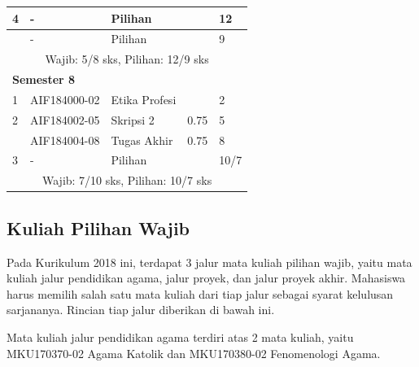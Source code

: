 \begin{table}[H]
\begin{tabular}{|p{0.5cm}|p{2.85cm}|p{4.95cm}|p{2.7cm}|p{2.7cm}|}
			4	& - &	Pilihan	& &	12  \\ \hline
				& - &	Pilihan	& &	9  \\ \hline
			\multicolumn{5}{|c|}{Wajib: 5/8 sks, Pilihan: 12/9 sks} \\ \hline
			\multicolumn{5}{|l|}{\textbf{Semester 8}} \\ \hline
			1 &	AIF184000-02 &	Etika Profesi &	&	2  \\ \hline
			2 &	AIF184002-05 &	Skripsi 2 &	0.75 &	5  \\ \hline
			 & AIF184004-08 &	Tugas Akhir &	0.75 &	8  \\ \hline
			3 &	- &	Pilihan	&  &	10/7  \\ \hline
			\multicolumn{5}{|c|}{Wajib: 7/10 sks, Pilihan: 10/7 sks} \\ \hline
		\end{tabular}
	\label{tab:2_strukturkurikulum2018}
\end{table}

\subsection{Kuliah Pilihan Wajib}

Pada Kurikulum 2018 ini, terdapat 3 jalur mata kuliah pilihan wajib, yaitu mata kuliah jalur pendidikan agama, jalur proyek, dan jalur proyek akhir. Mahasiswa harus memilih salah satu mata kuliah dari tiap jalur sebagai syarat kelulusan sarjananya. Rincian tiap jalur diberikan di bawah ini.

Mata kuliah jalur pendidikan agama terdiri atas 2 mata kuliah, yaitu MKU170370-02 Agama Katolik dan MKU170380-02 Fenomenologi Agama.
 
